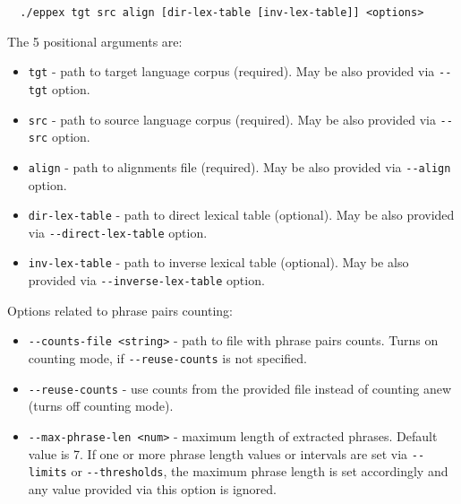 \begin{verbatim}
  ./eppex tgt src align [dir-lex-table [inv-lex-table]] <options>
\end{verbatim}

The 5 positional arguments are:
\begin{itemize}
 \item \verb|tgt| - path to target language corpus (required).
  May be also provided via \verb|--tgt| option.
 \item \verb|src| - path to source language corpus (required).
  May be also provided via \verb|--src| option.
 \item \verb|align| - path to alignments file (required).
  May be also provided via \verb|--align| option.
 \item \verb|dir-lex-table| - path to direct lexical table (optional).
  May be also provided via \verb|--direct-lex-table| option. 
 \item \verb|inv-lex-table| - path to inverse lexical table (optional).
  May be also provided via \verb|--inverse-lex-table| option. 
\end{itemize}

Options related to phrase pairs counting:
\begin{itemize}
 \item \verb|--counts-file <string>| - path to file with phrase pairs counts.
  Turns on counting mode, if \verb|--reuse-counts| is not specified.
 \item \verb|--reuse-counts| - use counts from the provided file instead
  of counting anew (turns off counting mode).
 \item \verb|--max-phrase-len <num>| - maximum length of extracted phrases.
  Default value is 7. If one or more phrase length values or intervals
  are set via \verb|--limits| or \verb|--thresholds|, the maximum phrase
  length is set accordingly and any value provided via this option is ignored.
\end{itemize}

